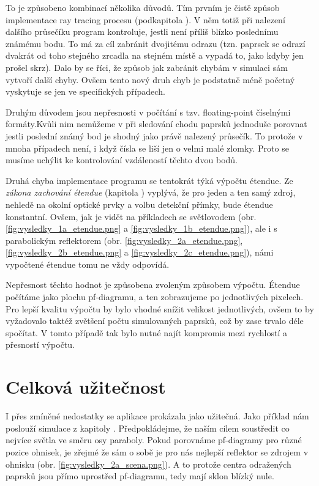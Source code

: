To je způsobeno kombinací několika důvodů. Tím prvním je čistě způsob implementace ray tracing procesu (podkapitola ). V něm totiž při nalezení dalšího průsečíku program kontroluje, jestli není příliš blízko poslednímu známému bodu. To má za cíl zabránit dvojitému odrazu (tzn. paprsek se odrazí dvakrát od toho stejného zrcadla na stejném místě a vypadá to, jako kdyby jen prošel skrz). Dalo by se říci, že způsob jak zabránit chybám v simulaci sám vytvoří další chyby. Ovšem tento nový druh chyb je podstatně méně početný vyskytuje se jen ve specifických případech.

Druhým důvodem jsou nepřesnosti v počítání s tzv. floating-point číselnými formáty.\src Kvůli nim nemůžeme v při sledování chodu paprsků jednoduše porovnat jestli poslední známý bod je shodný jako právě nalezený průsečík. To protože v mnoha případech není, i když čísla se liší jen o velmi malé zlomky. Proto se musíme uchýlit ke kontrolování vzdáleností těchto dvou bodů.

Druhá chyba implementace programu se tentokrát týká výpočtu étendue. Ze \emph{zákona zachování étendue} (kapitola ) vyplývá, že pro jeden a ten samý zdroj, nehledě na okolní optické prvky a volbu detekční přímky, bude étendue konstantní. Ovšem, jak je vidět na příkladech se světlovodem  (obr. \ref{fig:vysledky_1a_etendue.png} a \ref{fig:vysledky_1b_etendue.png}), ale i s parabolickým reflektorem (obr. \ref{fig:vysledky_2a_etendue.png}, \ref{fig:vysledky_2b_etendue.png} a \ref{fig:vysledky_2c_etendue.png}), námi vypočtené étendue tomu ne vždy odpovídá.

Nepřesnost těchto hodnot je způsobena zvoleným způsobem výpočtu. Étendue počítáme jako plochu pf-diagramu, a ten zobrazujeme po jednotlivých pixelech. Pro lepší kvalitu výpočtu by bylo vhodné snížit velikost jednotlivých, ovšem to by vyžadovalo taktéž zvětšení počtu simulovaných paprsků, což by zase trvalo déle spočítat. V tomto případě tak bylo nutné najít kompromis mezi rychlostí a přesností výpočtu.


\section{Celková užitečnost}

I přes zmíněné nedostatky se aplikace prokázala jako užitečná. Jako příklad nám poslouží simulace z kapitoly . Předpokládejme, že naším cílem soustředit co nejvíce světla ve směru osy paraboly. Pokud porovnáme pf-diagramy pro různé pozice ohnisek, je zřejmé že sám o sobě je pro nás nejlepší reflektor se zdrojem v ohnisku (obr. \ref{fig:vysledky_2a_scena.png}). A to protože centra odražených paprsků jsou přímo uprostřed pf-diagramu, tedy mají sklon blízký nule.

